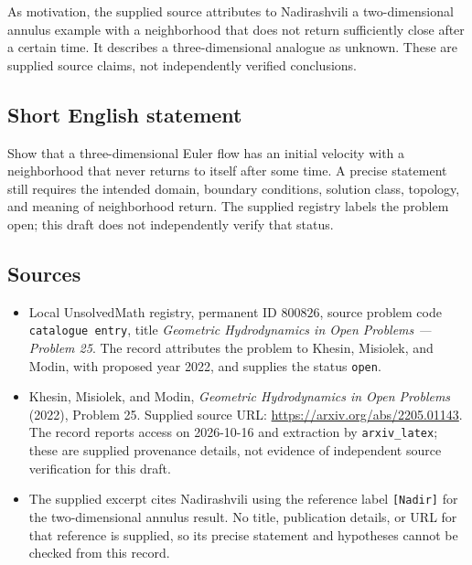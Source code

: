 \documentclass[11pt]{article}
\begin{document}
As motivation, the supplied source attributes to Nadirashvili a two-dimensional annulus example with a neighborhood that does not return sufficiently close after a certain time. It describes a three-dimensional analogue as unknown. These are supplied source claims, not independently verified conclusions.
\subsection{Short English statement}
Show that a three-dimensional Euler flow has an initial velocity with a neighborhood that never returns to itself after some time. A precise statement still requires the intended domain, boundary conditions, solution class, topology, and meaning of neighborhood return. The supplied registry labels the problem open; this draft does not independently verify that status.
\subsection{Sources}
\begin{itemize}
\item Local UnsolvedMath registry, permanent ID \(800826\), source problem code \texttt{catalogue entry}, title \emph{Geometric Hydrodynamics in Open Problems --- Problem 25}. The record attributes the problem to Khesin, Misiolek, and Modin, with proposed year 2022, and supplies the status \texttt{open}.
\item Khesin, Misiolek, and Modin, \emph{Geometric Hydrodynamics in Open Problems} (2022), Problem 25. Supplied source URL: \url{https://arxiv.org/abs/2205.01143}. The record reports access on 2026-10-16 and extraction by \texttt{arxiv\_latex}; these are supplied provenance details, not evidence of independent source verification for this draft.
\item The supplied excerpt cites Nadirashvili using the reference label \texttt{[Nadir]} for the two-dimensional annulus result. No title, publication details, or URL for that reference is supplied, so its precise statement and hypotheses cannot be checked from this record.
\end{itemize}
\end{document}
